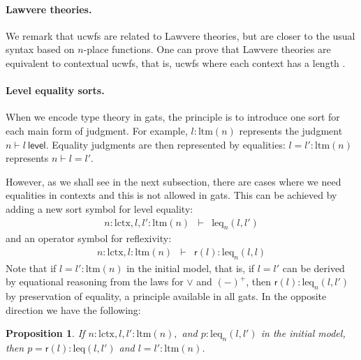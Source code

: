 \documentclass[11pt,a4paper]{article}
\theoremstyle{plain}
\newtheorem*{proposition*}{Proposition}%
\theoremstyle{definition}
\newcommand{\level}{\mathsf{level}}
\newcommand{\refl}{\mathsf{r}}
\def\lctx{\mathrm{lctx}}
\def\ltm{\mathrm{ltm}}
\def\leq{\mathrm{leq}}
\begin{document}
\paragraph{Lawvere theories.} We remark that ucwfs are related to Lawvere theories, but are closer to the usual syntax based on $n$-place functions. One can prove that Lawvere theories are equivalent to contextual ucwfs, that is, ucwfs where each context has a length \cite{ClairambaultD11,castellan:lambek}.

\paragraph{Level equality sorts.}
When we encode type theory in gats, the principle is to introduce one sort for each main form of judgment. For example, $l : \ltm(n)$ represents the judgment $n \vdash l\ \level$. Equality judgments are then represented by equalities: $l = l' : \ltm(n)$ represents $n \vdash l = l'$.

However, as we shall see in the next subsection, there are cases where we need equalities in contexts and this is not allowed in gats. This can be achieved by adding a new sort symbol for level equality:
\begin{eqnarray*}
n : \lctx, l, l'  : \ltm(n) &\vdash& \leq_n(l,l')
\end{eqnarray*}
and an operator symbol for reflexivity:
\begin{eqnarray*}
n : \lctx, l : \ltm(n) &\vdash& \refl(l) :  \leq_n(l,l)
\end{eqnarray*}
Note that if $l =  l' : \ltm(n)$ in the initial model, that is, if $l = l'$ can be derived by equational reasoning from the laws for $\vee$ and $(-)^+$, then $\refl(l) :  \leq_n(l,l')$
by preservation of equality, a principle available in all gats. In the opposite direction we have the following:
\begin{proposition*}
If $n : \lctx, l, l' : \ltm(n),$ and $p :  \leq_n(l,l')$ in the initial model,
then $p = \refl(l) : \leq(l,l')$ and $l = l' : \ltm(n)$.
\end{proposition*}
\end{document}
